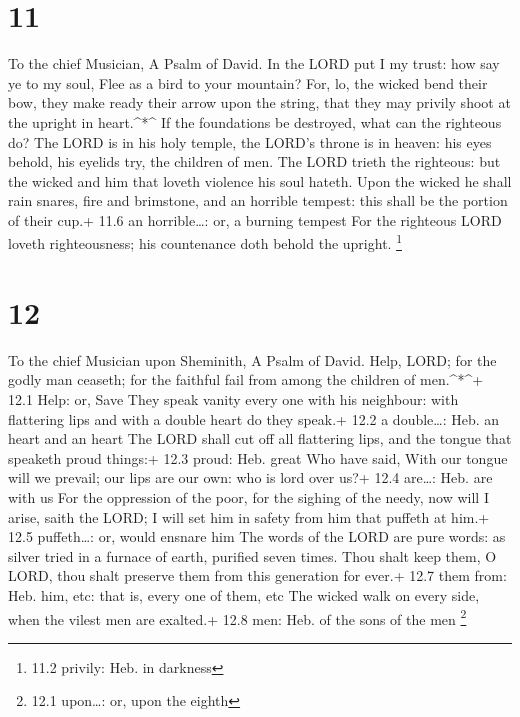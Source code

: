 \hypertarget{section-10}{%
\section{11}\label{section-10}}

To the chief Musician, A Psalm of David.  In the LORD put I
my trust: how say ye to my soul, Flee as a bird to your mountain?
 For, lo, the wicked bend their bow, they make ready their
arrow upon the string, that they may privily shoot at the upright in
heart.\^{}*\^{}  If the foundations be destroyed, what can
the righteous do?  The LORD is in his holy temple, the
LORD's throne is in heaven: his eyes behold, his eyelids try, the
children of men.  The LORD trieth the righteous: but the
wicked and him that loveth violence his soul hateth.  Upon
the wicked he shall rain snares, fire and brimstone, and an horrible
tempest: this shall be the portion of their cup.+ 11.6 an
horrible\ldots: or, a burning tempest  For the righteous
LORD loveth righteousness; his countenance doth behold the upright.
\footnote{11.2 privily: Heb. in darkness}

\hypertarget{section-11}{%
\section{12}\label{section-11}}

To the chief Musician upon Sheminith, A Psalm of David. 
Help, LORD; for the godly man ceaseth; for the faithful fail from among
the children of men.\^{}*\^{}+ 12.1 Help: or, Save  They
speak vanity every one with his neighbour: with flattering lips and with
a double heart do they speak.+ 12.2 a double\ldots: Heb. an heart and an
heart  The LORD shall cut off all flattering lips, and the
tongue that speaketh proud things:+ 12.3 proud: Heb. great 
Who have said, With our tongue will we prevail; our lips are our own:
who is lord over us?+ 12.4 are\ldots: Heb. are with us  For
the oppression of the poor, for the sighing of the needy, now will I
arise, saith the LORD; I will set him in safety from him that puffeth at
him.+ 12.5 puffeth\ldots: or, would ensnare him  The words
of the LORD are pure words: as silver tried in a furnace of earth,
purified seven times.  Thou shalt keep them, O LORD, thou
shalt preserve them from this generation for ever.+ 12.7 them from: Heb.
him, etc: that is, every one of them, etc  The wicked walk
on every side, when the vilest men are exalted.+ 12.8 men: Heb. of the
sons of the men \footnote{12.1 upon\ldots: or, upon the eighth}

